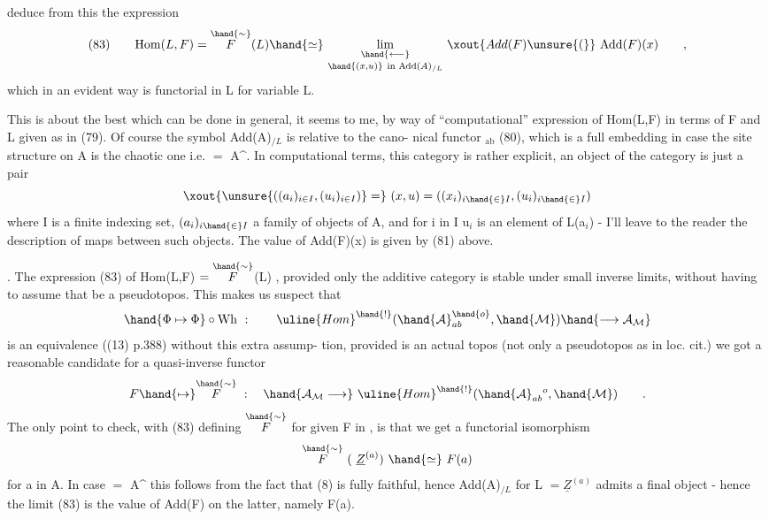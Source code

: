 deduce from this the expression
\[
(83)\qquad \mathrm{Hom}(L,F) = \overset{\hand{\sim}}{F}(L)\hand{\simeq}\ \underset{\hand{(x,u)}\ \text{in Add}(A)_{/L}}{\underset{\hand{\longleftarrow}}{\lim}}\ \xout{Add(F)\unsure{(}}\ \mathrm{Add}(F)(x) \qquad ,
\]
which in an evident way is functorial in L for variable L.

This is about the best which can be done in general,  it seems to me,
by way of ``computational'' expression of Hom(L,F) in terms of F and L
given as in (79).  Of course the symbol Add(A)$_{/L}$ is relative to the cano-%
nical functor \hand{$\varepsilon$}$_{\mathrm{ab}}$ (80),  which is a full embedding in case the site
structure on A is the chaotic one i.e. $=$ A\^{}.  In computational terms,
this category is rather explicit,  an object of the category is just a
pair
\[
\xout{\unsure{((a_i)_{i\in I},(u_i)_{i\in I})}=}\ ( x , u) = ((x_i)_{i\hand{\in} I} , (u_i)_{i\hand{\in} I})
\]
where I is a finite indexing set,  $(a_i)_{i\hand{\in} I}$ a family of objects of A,  and
for i in I\hand{,} u$_i$ is an element of  L(a$_i$)  -  I'll leave to the reader the
description of maps between such objects.  The value of Add(F)(x) is given
by (81) above.

\hand{\uline{\textcolor{black}{Remark}}}.  The expression (83) of Hom(L,F) $=\overset{\hand{\sim}}{F}$(L)  , provided
only the additive category  is stable under small inverse limits,
without having to assume that  be a pseudotopos.  This makes us suspect
that  
\[
\hand{\Phi\mapsto\Phi}\circ\mathrm{Wh} \ :\qquad \uline{Hom}^{\hand{!}}(\hand{\mathcal{A}}^{\hand{o}}_{ab},\hand{\mathcal{M}})\hand{\longrightarrow\mathcal{A}_{\mathcal{M}}}
\]
is an equivalence ((13)  p.388)   without  this extra assump-%
tion,  provided  is an actual topos (not only a pseudotopos as in loc.
cit.)\hand{,}   we got a reasonable candidate for a quasi-inverse functor
\[
F\hand{\mapsto}\overset{\hand{\sim}}{F}\ :\quad \hand{\mathcal{A}_{\mathcal{M}}\longrightarrow}\ \uline{Hom}^{\hand{!}}(\hand{\mathcal{A}}_{ab}{}^{o},\hand{\mathcal{M}}) \qquad .
\]
The only point  to check,  with (83) defining $\overset{\hand{\sim}}{F}$ for given F in ,  is
that we get a functorial isomorphism
\[
\overset{\hand{\sim}}{F}\ (\ \underline{Z}^{(a)})\ \hand{\simeq}\ F(a)
\]
for a in A.  In case $=$ A\^{} this follows from the fact that (8) is fully
faithful,  hence  Add(A)$_{/L}$  for  L $=\underline{Z}^{(a)}$ admits a final object  -  hence
the limit (83) is the value of Add(F) on the latter,  namely F(a).


